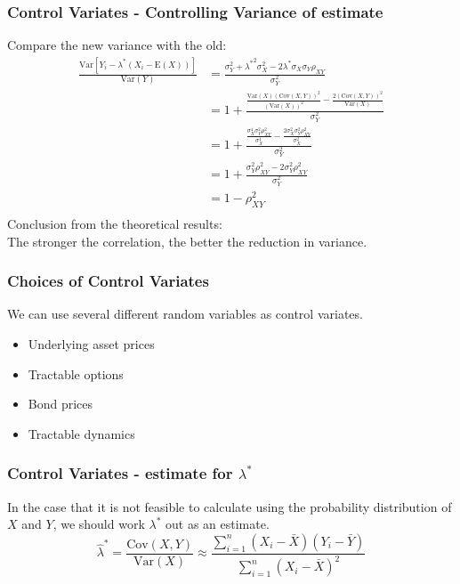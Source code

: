 \documentclass{beamer}
\begin{document}
\begin{frame}
\frametitle{Control Variates - Controlling Variance of estimate}
Compare the new variance with the old:
\begin{equation*}
\begin{split}
\frac{\mathrm{Var} [Y_{i} - \lambda^{*}(X_{i} - \mathrm{E}(X))]}{\mathrm{Var}(Y)}
&=\frac{\sigma_{Y}^{2} + {\lambda^{*}}^{2}\sigma_{X}^{2}-2\lambda^{*}\sigma_{X}\sigma_{Y}\rho_{XY}}{\sigma_{Y}^{2}} \\
&=1+\frac{\frac{\mathrm{Var}(X)(\mathrm{Cov}(X,Y))^{2}}{(\mathrm{Var}(X))^{2}}-\frac{2(\mathrm{Cov}(X,Y))^{2}}{\mathrm{Var}(X)}}{\sigma_{Y}^{2}}\\
&=1+\frac{\frac{\sigma_{X}^{4}\sigma_{Y}^{2}\rho_{XY}^{2}}{\sigma_{X}^{4}}-\frac{2\sigma_{X}^{2}\sigma_{Y}^{2}\rho_{XY}^{2}}{\sigma_{X}^{2}}}{\sigma_{Y}^{2}}\\
&=1+\frac{\sigma_{Y}^{2}\rho_{XY}^{2}-2\sigma_{Y}^{2}\rho_{XY}^{2}}{\sigma_{Y}^{2}}\\
&=1-\rho_{XY}^{2}\\
\end{split}
\end{equation*}
Conclusion from the theoretical results:\\
The stronger the correlation, the better the reduction in variance.
\end{frame}

\begin{frame}
\frametitle{Choices of Control Variates}
We can use several different random variables as control variates.
\begin{itemize}
	\item Underlying asset prices
	\item Tractable options
	\item Bond prices
	\item Tractable dynamics
\end{itemize}
\end{frame}

\begin{frame}
\frametitle{Control Variates - estimate for $\lambda^{*}$}
In the case that it is not feasible to calculate using the probability distribution of $X$ and $Y$, we should work $\lambda^{*}$ out as an estimate.
$$ \hat{\lambda}^{*} = \frac{\mathrm{Cov}(X,Y)}{\mathrm{Var}(X)} \approx \frac{\sum_{i=1}^{n}(X_{i}-\bar{X})(Y_{i}-\bar{Y})}{\sum_{i=1}^{n}(X_{i}-\bar{X})^{2}}$$
\end{frame}
\end{document}
